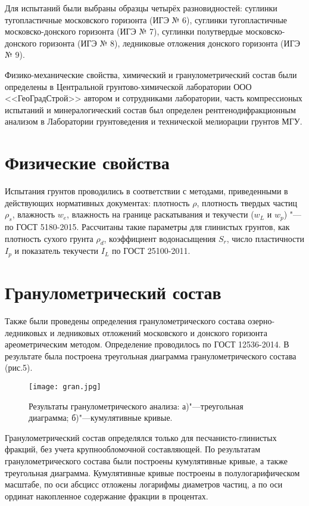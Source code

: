 Для испытаний были выбраны образцы четырёх разновидностей: суглинки тугопластичные московского горизонта (ИГЭ № 6), суглинки тугопластичные московско-донского горизонта (ИГЭ № 7), суглинки полутвердые московско-донского горизонта (ИГЭ № 8), ледниковые отложения донского горизонта (ИГЭ № 9). 

Физико-механические свойства, химический и гранулометрический состав были определены в Центральной грунтово-химической лаборатории ООО <<ГеоГрадСтрой>> автором и сотрудниками лаборатории,
часть компрессионых испытаний и минералогический состав был определен рентгенодифракционным анализом в Лаборатории грунтоведения и технической мелиорации грунтов МГУ.

\section{Физические свойства}

Испытания грунтов проводились в соответствии с методами, приведенными в действующих нормативных документах:
плотность $\rho$, 
плотность твердых частиц $\rho_s$, 
влажность $w_e$, 
влажность на границе раскатывания и текучести ($w_L$ и $w_p$) "--- по ГОСТ 5180-2015. 
Рассчитаны такие параметры для глинистых грунтов, как
плотность сухого грунта $\rho_d$,  
коэффициент водонасыщения $S_r$, 
число пластичности $I_p$ 
и показатель текучести $I_L$ по ГОСТ 25100-2011.
 

\section{Гранулометрический состав}

Также были проведены определения гранулометрического состава озерно-ледниковых и ледниковых отложений московского и донского горизонта ареометрическим методом. Определение проводилось по ГОСТ 12536-2014. В результате была построена треугольная диаграмма гранулометрического состава (рис.5).

\begin{figure}[ht]
    \texttt{[image: gran.jpg]}
    \caption{Результаты гранулометрического анализа: а)"---треугольная диаграмма; б)"---кумулятивные кривые.}
\end{figure}

Гранулометрический состав определялся только для песчанисто-глинистых фракций, без учета крупнообломочной составляющей.
По результатам гранулометрического состава были построены кумулятивные кривые, а также треугольная диаграмма.
Кумулятивные кривые построены в полулогарифическом масштабе, 
по оси абсцисс отложены логарифмы диаметров частиц, 
а по оси ординат накопленное содержание фракции в процентах.

